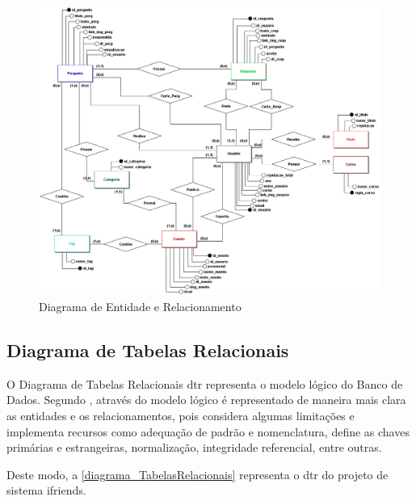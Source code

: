 \begin{figure}[htb]
\centering
\caption{Diagrama de Entidade e Relacionamento}
\label{diagrama_EntidadeRelacionamento}
\includegraphics[width=1\textwidth]{anexos/Imagens_Diagramas/DER_IFriends.png}
\end{figure}
\FloatBarrier

\subsection{Diagrama de Tabelas Relacionais}
O Diagrama de Tabelas Relacionais \acs{dtr} representa o modelo lógico do Banco de Dados. Segundo , através do modelo lógico é representado de maneira mais clara as entidades e os relacionamentos, pois considera algumas limitações e implementa recursos como adequação de padrão e nomenclatura, define as chaves primárias e estrangeiras, normalização, integridade referencial, entre outras.

Deste modo, a \autoref{diagrama_TabelasRelacionais} representa o \ac{dtr} do projeto de sistema \gls{ifriends}.

